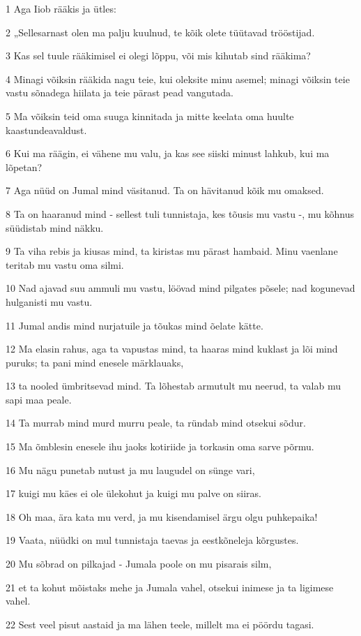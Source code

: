 \par 1 Aga Iiob rääkis ja ütles:
\par 2 „Sellesarnast olen ma palju kuulnud, te kõik olete tüütavad trööstijad.
\par 3 Kas sel tuule rääkimisel ei olegi lõppu, või mis kihutab sind rääkima?
\par 4 Minagi võiksin rääkida nagu teie, kui oleksite minu asemel; minagi võiksin teie vastu sõnadega hiilata ja teie pärast pead vangutada.
\par 5 Ma võiksin teid oma suuga kinnitada ja mitte keelata oma huulte kaastundeavaldust.
\par 6 Kui ma räägin, ei vähene mu valu, ja kas see siiski minust lahkub, kui ma lõpetan?
\par 7 Aga nüüd on Jumal mind väsitanud. Ta on hävitanud kõik mu omaksed.
\par 8 Ta on haaranud mind - sellest tuli tunnistaja, kes tõusis mu vastu -, mu kõhnus süüdistab mind näkku.
\par 9 Ta viha rebis ja kiusas mind, ta kiristas mu pärast hambaid. Minu vaenlane teritab mu vastu oma silmi.
\par 10 Nad ajavad suu ammuli mu vastu, löövad mind pilgates põsele; nad kogunevad hulganisti mu vastu.
\par 11 Jumal andis mind nurjatuile ja tõukas mind õelate kätte.
\par 12 Ma elasin rahus, aga ta vapustas mind, ta haaras mind kuklast ja lõi mind puruks; ta pani mind enesele märklauaks,
\par 13 ta nooled ümbritsevad mind. Ta lõhestab armutult mu neerud, ta valab mu sapi maa peale.
\par 14 Ta murrab mind murd murru peale, ta ründab mind otsekui sõdur.
\par 15 Ma õmblesin enesele ihu jaoks kotiriide ja torkasin oma sarve põrmu.
\par 16 Mu nägu punetab nutust ja mu laugudel on sünge vari,
\par 17 kuigi mu käes ei ole ülekohut ja kuigi mu palve on siiras.
\par 18 Oh maa, ära kata mu verd, ja mu kisendamisel ärgu olgu puhkepaika!
\par 19 Vaata, nüüdki on mul tunnistaja taevas ja eestkõneleja kõrgustes.
\par 20 Mu sõbrad on pilkajad - Jumala poole on mu pisarais silm,
\par 21 et ta kohut mõistaks mehe ja Jumala vahel, otsekui inimese ja ta ligimese vahel.
\par 22 Sest veel pisut aastaid ja ma lähen teele, millelt ma ei pöördu tagasi.

